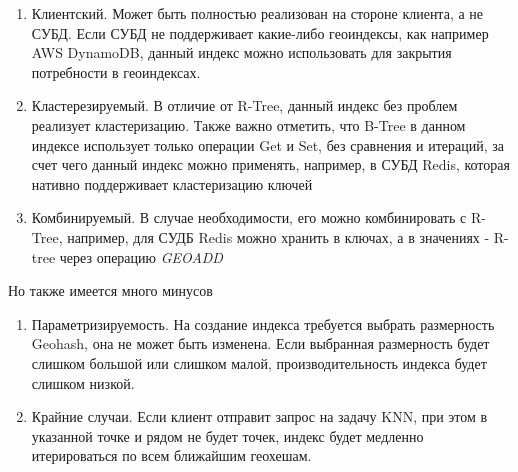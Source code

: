 \begin{enumerate}
    \item Клиентский. Может быть полностью реализован на стороне клиента, а не СУБД. Если СУБД не поддерживает какие-либо геоиндексы, как например AWS DynamoDB, данный индекс можно использовать для закрытия потребности в геоиндексах. 
    \item Кластерезируемый. В отличие от R-Tree, данный индекс без проблем реализует кластеризацию. Также важно отметить, что B-Tree в данном индексе использует только операции Get и Set, без сравнения и итераций, за счет чего данный индекс можно применять, например, в СУБД Redis, которая нативно поддерживает кластеризацию ключей 
    \item Комбинируемый. В случае необходимости, его можно комбинировать с R-Tree, например, для СУДБ Redis можно хранить в ключах, а в значениях - R-tree через операцию \textit{GEOADD}\cite{redisGeo}
\end{enumerate}
Но также имеется много минусов
\begin{enumerate}
    \item Параметризируемость. На создание индекса требуется выбрать размерность Geohash, она не может быть изменена. Если выбранная размерность будет слишком большой или слишком малой, производительность индекса будет слишком низкой. 
    \item Крайние случаи. Если клиент отправит запрос на задачу KNN, при этом в указанной точке и рядом не будет точек, индекс будет медленно итерироваться по всем ближайшим геохешам.
\end{enumerate}